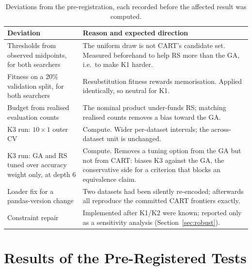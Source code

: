 \documentclass[11pt]{article}
\newcommand{\GA}{GA\xspace}
\newcommand{\RS}{RS\xspace}
\begin{document}
\begin{table}[t]
  \centering
  \caption{Deviations from the pre-registration, each recorded before the affected
  result was computed.}
  \label{tab:deviations}
  \small
  \begin{tabular}{p{}p{}}
  \toprule
  Deviation & Reason and expected direction \\
  \midrule
  Thresholds from observed midpoints, for both searchers & The uniform draw is not CART's
  candidate set. Measured beforehand to help \RS{} more than the \GA, i.e.\ to make K1
  harder. \\
  Fitness on a 20\% validation split, for both searchers & Resubstitution fitness rewards
  memorisation. Applied identically, so neutral for K1. \\
  Budget from realised evaluation counts & The nominal product under-funds \RS; matching
  realised counts removes a bias toward the \GA. \\
  K3 run: $10\times1$ outer CV & Compute. Wider per-dataset intervals; the across-dataset
  unit is unchanged. \\
  K3 run: \GA{} and \RS{} tuned over accuracy weight only, at depth 6 & Compute. Removes a
  tuning option from the \GA{} but not from CART: biases K3 against the \GA, the
  conservative side for a criterion that blocks an equivalence claim. \\
  Loader fix for a pandas-version change & Two datasets had been silently re-encoded;
  afterwards all \NDatasets{} reproduce the committed CART frontiers exactly. \\
  Constraint repair & Implemented after K1/K2 were known; reported only as a sensitivity
  analysis (Section~\ref{sec:robust}). \\
  \bottomrule
  \end{tabular}
\end{table}

\section{Results of the Pre-Registered Tests}
\label{sec:results}
\end{document}
